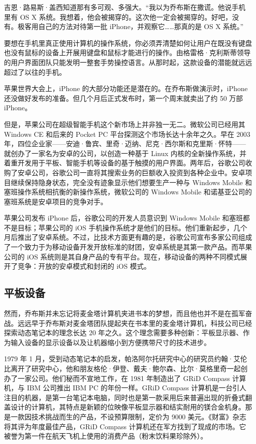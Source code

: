 \documentclass[12pt,UTF8]{ctexbook}
\begin{document}
吉恩·路易斯·盖西知道那有多可观、多强大。“我以为乔布斯在撒谎。他说手机里有 OS X 系统。我想着，他会被揭穿的。这次他一定会被揭穿的。好吧，没有。极客用自己的方法对待第一批 iPhone，并观察它……那真的是 OS X 系统。”

要想在手机里真正使用计算机的操作系统，你必须弄清楚如何让用户在既没有键盘也没有鼠标的设备上开展用键盘和鼠标才能进行的操作。由格雷格·克利斯蒂领导的用户界面团队只能发明一整套手势操控语言。从那时起，这款设备的潜能就远远超过了以往的手机。

苹果世界大会上，iPhone 的大部分功能还是潜在的。在乔布斯做演示时，iPhone 还没做好发布的准备。但几个月后正式发布时，第一个周末就卖出了约 50 万部 iPhone。

但是，苹果公司在超级智能手机这个新市场上并非独一无二。微软公司已经用其 Windows CE 和后来的 Pocket PC 平台探测这个市场长达十余年之久。早在 2003 年，四位企业家——安迪·鲁宾、里奇·迈纳、尼克·西尔斯和克里斯·怀特——就创办了一家名为安卓的公司，以创造一种基于 Linux 内核的全新操作系统，并着重开发用于平板、智能手机等设备的基于触摸的用户界面。两年后，谷歌公司收购了安卓公司，谷歌公司一直将其搜索业务的巨额收入投资到各种企业中。安卓项目继续保持隐身状态，完全没有迹象显示他们想要生产一种与 Windows Mobile 和塞班操作系统相抗衡的新操作系统，微软公司的 Windows Mobile 和诺基亚公司的塞班系统是安卓项目的竞争对手。

苹果公司发布 iPhone 后，谷歌公司的开发人员意识到 Windows Mobile 和塞班都不是目标；苹果公司的 iOS 手机操作系统才是他们的目标。他们重新起步，几个月后推出了安卓系统。不过，比技术方面更有趣的是，谷歌公司宣布多家公司组成了一个致力于为移动设备开发开放标准的财团，安卓系统是其第一款产品。而苹果公司的 iOS 系统则是其自身产品的专有平台。现在，移动设备的两种不同模式展开了竞争：开放的安卓模式和封闭的 iOS 模式。





\subsection{平板设备}


然而，乔布斯并未忘记将麦金塔计算机夹进书本的梦想，而且他也并不是在孤军奋战。远远早于乔布斯对麦金塔团队提起夹在书本里的麦金塔计算机，科技公司已经探索动态笔记本的理念长达 20 年之久。这个理念需要多种创新：平板显示器、作为输入设备的显示设备以及让机器缩小到方便携带尺寸的技术进步。

1979 年 1 月，受到动态笔记本的启发，帕洛阿尔托研究中心的研究员约翰·艾伦比离开了研究中心，他和朋友格伦·伊登、戴夫·鲍尔森、比尔·莫格里奇一起创办了一家公司。他们秘而不宣地工作，在 1981 年制造出了 GRiD Compass 计算机，与 IBM 公司推出 IBM PC 的年份一样。GRiD Compass 计算机是一台引人注目的机器，是第一台笔记本电脑，同时也是第一款采用后来普遍出现的折叠式翻盖设计的计算机，其特点是新颖的位映像平板显示器和结实耐用的镁合金机身。那是一款因技术挑战而生的产品，不设预算限制，定价为 9000 美元。《财富》杂志将其评为年度最佳产品，GRiD Compass 计算机还在军方找到了现成的市场。它被誉为第一件在航天飞机上使用的消费产品（粉末饮料果珍除外）。
\end{document}
